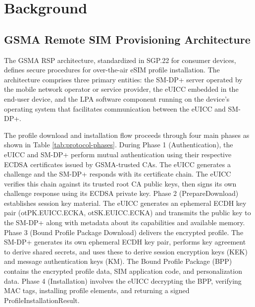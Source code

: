 \documentclass{easychair}
\begin{document}
\section{Background}

\subsection{GSMA Remote SIM Provisioning Architecture}

The GSMA RSP architecture, standardized in SGP.22 for consumer devices, defines secure procedures for over-the-air eSIM profile installation. The architecture comprises three primary entities: the SM-DP+ server operated by the mobile network operator or service provider, the eUICC embedded in the end-user device, and the LPA software component running on the device's operating system that facilitates communication between the eUICC and SM-DP+.

The profile download and installation flow proceeds through four main phases as shown in Table \ref{tab:protocol-phases}. During Phase 1 (Authentication), the eUICC and SM-DP+ perform mutual authentication using their respective ECDSA certificates issued by GSMA-trusted CAs. The eUICC generates a challenge and the SM-DP+ responds with its certificate chain. The eUICC verifies this chain against its trusted root CA public keys, then signs its own challenge response using its ECDSA private key. Phase 2 (PrepareDownload) establishes session key material. The eUICC generates an ephemeral ECDH key pair (otPK.EUICC.ECKA, otSK.EUICC.ECKA) and transmits the public key to the SM-DP+ along with metadata about its capabilities and available memory. Phase 3 (Bound Profile Package Download) delivers the encrypted profile. The SM-DP+ generates its own ephemeral ECDH key pair, performs key agreement to derive shared secrets, and uses these to derive session encryption keys (KEK) and message authentication keys (KM). The Bound Profile Package (BPP) contains the encrypted profile data, SIM application code, and personalization data. Phase 4 (Installation) involves the eUICC decrypting the BPP, verifying MAC tags, installing profile elements, and returning a signed ProfileInstallationResult.
\end{document}
